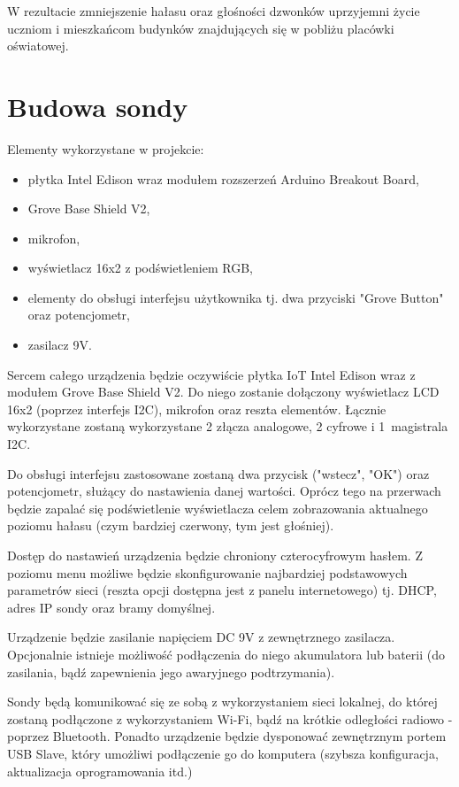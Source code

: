 \documentclass[12pt, a4paper]{article}
\begin{document}
W rezultacie zmniejszenie hałasu oraz głośności dzwonków uprzyjemni życie uczniom i mieszkańcom budynków znajdujących się w pobliżu placówki oświatowej.

\section{Budowa sondy}

Elementy wykorzystane w projekcie:
\begin{itemize}
\item płytka Intel Edison wraz modułem rozszerzeń Arduino Breakout Board,
\item Grove Base Shield V2,
\item mikrofon,
\item wyświetlacz 16x2 z podświetleniem RGB,
\item elementy do obsługi interfejsu użytkownika tj. dwa przyciski "Grove Button" oraz potencjometr,
\item zasilacz 9V.
\end{itemize}

Sercem całego urządzenia będzie oczywiście płytka IoT Intel Edison wraz z modułem Grove Base Shield V2. Do niego zostanie dołączony wyświetlacz LCD 16x2 (poprzez interfejs I2C), mikrofon oraz reszta elementów. Łącznie wykorzystane zostaną wykorzystane 2 złącza analogowe, 2 cyfrowe i 1~magistrala I2C. 

Do obsługi interfejsu zastosowane zostaną dwa przycisk ("wstecz", "OK") oraz potencjometr, służący do nastawienia danej wartości. Oprócz tego na przerwach będzie zapalać się podświetlenie wyświetlacza celem zobrazowania aktualnego poziomu hałasu (czym bardziej czerwony, tym jest głośniej).

Dostęp do nastawień urządzenia będzie chroniony czterocyfrowym hasłem. Z poziomu menu możliwe będzie skonfigurowanie najbardziej podstawowych parametrów sieci (reszta opcji dostępna jest z panelu internetowego) tj. DHCP, adres IP sondy oraz bramy domyślnej.

Urządzenie będzie zasilanie napięciem DC 9V z zewnętrznego zasilacza. Opcjonalnie istnieje możliwość podłączenia do niego akumulatora lub baterii (do zasilania, bądź zapewnienia jego awaryjnego podtrzymania).

Sondy będą komunikować się ze sobą z wykorzystaniem sieci lokalnej, do której zostaną podłączone z wykorzystaniem Wi-Fi, bądź na krótkie odległości radiowo - poprzez Bluetooth. Ponadto urządzenie będzie dysponować zewnętrznym portem USB Slave, który umożliwi podłączenie go do komputera (szybsza konfiguracja, aktualizacja oprogramowania itd.)
\end{document}
